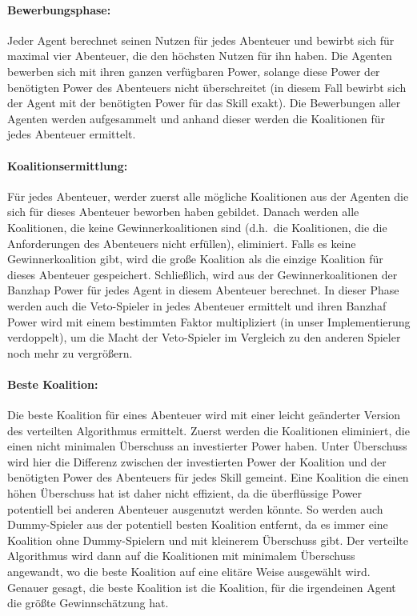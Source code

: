 \documentclass[fleqn,10pt]{SelfArx} %
\begin{document}
\paragraph{Bewerbungsphase:}
Jeder Agent berechnet seinen Nutzen für jedes Abenteuer und bewirbt sich für maximal vier Abenteuer, die den höchsten Nutzen für ihn haben. Die Agenten bewerben sich mit ihren ganzen verfügbaren Power, solange diese Power der benötigten Power des Abenteuers nicht überschreitet (in diesem Fall bewirbt sich der Agent mit der benötigten Power für das Skill exakt).  Die Bewerbungen aller Agenten werden aufgesammelt und anhand dieser werden die Koalitionen für jedes Abenteuer ermittelt. 

\paragraph{Koalitionsermittlung:}
Für jedes Abenteuer, werder zuerst alle mögliche Koalitionen aus der Agenten die sich für dieses Abenteuer beworben haben gebildet. Danach werden alle Koalitionen, die keine Gewinnerkoalitionen sind (d.h.\ die Koalitionen, die die Anforderungen des Abenteuers nicht erfüllen), eliminiert. Falls es keine Gewinnerkoalition gibt, wird die große Koalition als die einzige Koalition für dieses Abenteuer gespeichert. Schließlich, wird aus der Gewinnerkoalitionen der Banzhap Power für jedes Agent in diesem Abenteuer berechnet. In dieser Phase werden auch die Veto-Spieler in jedes Abenteuer ermittelt und ihren Banzhaf Power wird mit einem bestimmten Faktor multipliziert (in unser Implementierung verdoppelt), um die Macht der Veto-Spieler im Vergleich zu den anderen Spieler noch mehr zu vergrößern. 

\paragraph{Beste Koalition:}
Die beste Koalition für eines Abenteuer wird mit einer leicht geänderter Version des verteilten Algorithmus ermittelt. Zuerst werden die Koalitionen eliminiert, die einen nicht minimalen Überschuss an investierter Power haben. Unter Überschuss wird hier die Differenz zwischen der investierten Power der Koalition und der benötigten Power des Abenteuers für jedes Skill gemeint. Eine Koalition die einen höhen Überschuss hat ist daher nicht effizient, da die überflüssige Power potentiell bei anderen Abenteuer ausgenutzt werden könnte. So werden auch Dummy-Spieler aus der potentiell besten Koalition entfernt, da es immer eine Koalition ohne Dummy-Spielern und mit kleinerem Überschuss gibt. Der verteilte Algorithmus wird dann auf die Koalitionen mit minimalem Überschuss angewandt, wo die beste Koalition auf eine elitäre Weise ausgewählt wird. Genauer gesagt, die beste Koalition ist die Koalition, für die irgendeinen Agent die größte Gewinnschätzung hat.
\end{document}
